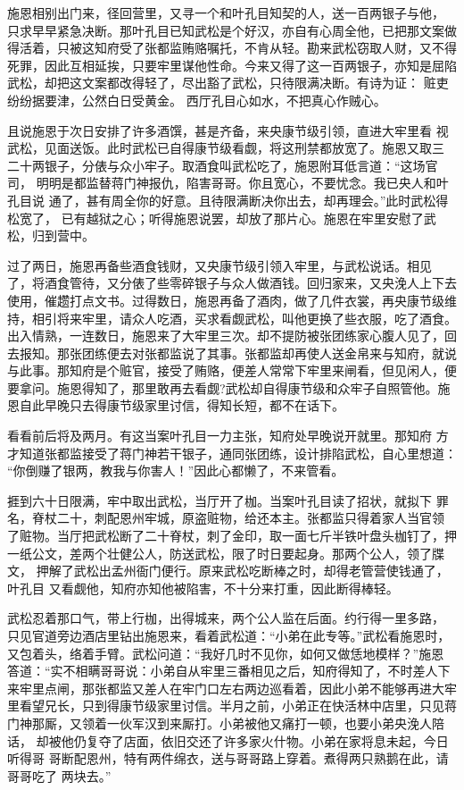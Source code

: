 施恩相别出门来，径回营里，又寻一个和叶孔目知契的人，送一百两银子与他，
只求早早紧急决断。那叶孔目已知武松是个好汉，亦自有心周全他，已把那文案做
得活着，只被这知府受了张都监贿赂嘱托，不肯从轻。勘来武松窃取人财，又不得
死罪，因此互相延挨，只要牢里谋他性命。今来又得了这一百两银子，亦知是屈陷
武松，却把这文案都改得轻了，尽出豁了武松，只待限满决断。有诗为证：
赃吏纷纷据要津，公然白日受黄金。
西厅孔目心如水，不把真心作贼心。

且说施恩于次日安排了许多酒馔，甚是齐备，来央康节级引领，直进大牢里看
视武松，见面送饭。此时武松已自得康节级看觑，将这刑禁都放宽了。施恩又取三
二十两银子，分俵与众小牢子。取酒食叫武松吃了，施恩附耳低言道：“这场官司，
明明是都监替蒋门神报仇，陷害哥哥。你且宽心，不要忧念。我已央人和叶孔目说
通了，甚有周全你的好意。且待限满断决你出去，却再理会。”此时武松得松宽了，
已有越狱之心；听得施恩说罢，却放了那片心。施恩在牢里安慰了武松，归到营中。

过了两日，施恩再备些酒食钱财，又央康节级引领入牢里，与武松说话。相见
了，将酒食管待，又分俵了些零碎银子与众人做酒钱。回归家来，又央浼人上下去
使用，催趱打点文书。过得数日，施恩再备了酒肉，做了几件衣裳，再央康节级维
持，相引将来牢里，请众人吃酒，买求看觑武松，叫他更换了些衣服，吃了酒食。
出入情熟，一连数日，施恩来了大牢里三次。却不提防被张团练家心腹人见了，回
去报知。那张团练便去对张都监说了其事。张都监却再使人送金帛来与知府，就说
与此事。那知府是个赃官，接受了贿赂，便差人常常下牢里来闸看，但见闲人，便
要拿问。施恩得知了，那里敢再去看觑?武松却自得康节级和众牢子自照管他。施
恩自此早晚只去得康节级家里讨信，得知长短，都不在话下。

看看前后将及两月。有这当案叶孔目一力主张，知府处早晚说开就里。那知府
方才知道张都监接受了蒋门神若干银子，通同张团练，设计排陷武松，自心里想道：
“你倒赚了银两，教我与你害人！”因此心都懒了，不来管看。

捱到六十日限满，牢中取出武松，当厅开了枷。当案叶孔目读了招状，就拟下
罪名，脊杖二十，刺配恩州牢城，原盗赃物，给还本主。张都监只得着家人当官领
了赃物。当厅把武松断了二十脊杖，刺了金印，取一面七斤半铁叶盘头枷钉了，押
一纸公文，差两个壮健公人，防送武松，限了时日要起身。那两个公人，领了牒文，
押解了武松出孟州衙门便行。原来武松吃断棒之时，却得老管营使钱通了，叶孔目
又看觑他，知府亦知他被陷害，不十分来打重，因此断得棒轻。

武松忍着那口气，带上行枷，出得城来，两个公人监在后面。约行得一里多路，
只见官道旁边酒店里钻出施恩来，看着武松道：“小弟在此专等。”武松看施恩时，
又包着头，络着手臂。武松问道：“我好几时不见你，如何又做恁地模样？”施恩
答道：“实不相瞒哥哥说：小弟自从牢里三番相见之后，知府得知了，不时差人下
来牢里点闸，那张都监又差人在牢门口左右两边巡看着，因此小弟不能够再进大牢
里看望兄长，只到得康节级家里讨信。半月之前，小弟正在快活林中店里，只见蒋
门神那厮，又领着一伙军汉到来厮打。小弟被他又痛打一顿，也要小弟央浼人陪话，
却被他仍复夺了店面，依旧交还了许多家火什物。小弟在家将息未起，今日听得哥
哥断配恩州，特有两件绵衣，送与哥哥路上穿着。煮得两只熟鹅在此，请哥哥吃了
两块去。”


